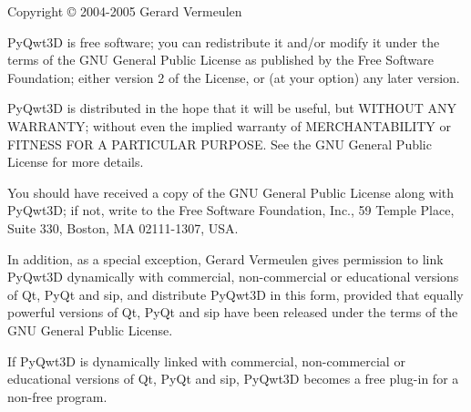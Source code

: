 Copyright \copyright{} 2004-2005 Gerard Vermeulen

PyQwt3D is free software; you can redistribute it and/or modify it under the
terms of the GNU General Public License as published by the Free Software
Foundation; either version 2 of the License, or (at your option) any later
version.

PyQwt3D is distributed in the hope that it will be useful, but WITHOUT ANY
WARRANTY; without even the implied warranty of MERCHANTABILITY or FITNESS
FOR A PARTICULAR PURPOSE.  See the GNU  General Public License for more
details.

You should have received a copy of the GNU General Public License along with
PyQwt3D; if not, write to the Free Software Foundation, Inc., 59 Temple Place,
Suite 330, Boston, MA 02111-1307, USA.

In addition, as a special exception, Gerard Vermeulen gives permission to
link PyQwt3D dynamically with commercial, non-commercial or educational 
versions of Qt, PyQt and sip, and distribute PyQwt3D in this form, provided
that equally powerful versions of Qt, PyQt and sip have been released under
the terms of the GNU General Public License.

If PyQwt3D is dynamically linked with commercial, non-commercial or
educational versions of Qt, PyQt and sip, PyQwt3D becomes a free plug-in
for a non-free program.
